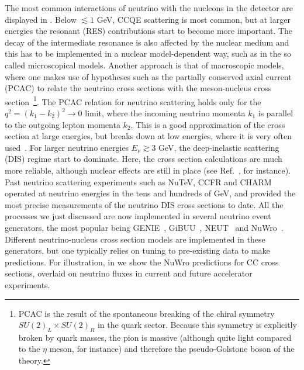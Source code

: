 The most common interactions of neutrino with the nucleons in the detector are displayed in . Below $\lesssim1$ GeV, CCQE scattering is most common, but at larger energies the resonant (RES) contributions start to become more important. The decay of the intermediate resonance is also affected by the nuclear medium and this has to be implemented in a nuclear model-dependent way, such as in the so called microscopical models. Another approach is that of macroscopic models, where one makes use of hypotheses such as the partially conserved axial current (PCAC) to relate the neutrino cross sections with the meson-nucleus cross section~\footnote{PCAC is the result of the spontaneous breaking of the chiral symmetry $SU(2)_L \times SU(2)_R$ in the quark sector. Because this symmetry is explicitly broken by quark masses, the pion is massive (although quite light compared to the $\eta$ meson, for instance) and therefore the pseudo-Golstone boson of the theory.}. The PCAC relation for neutrino scattering holds only for the $q^2 = (k_1 - k_2)^2 \to 0$ limit, where the incoming neutrino momenta $k_1$ is parallel to the outgoing lepton momenta $k_2$. This is a good approximation of the cross section at large energies, but breaks down at low energies, where it is very often used~\cite{Hernandez:2009vm}. For larger neutrino energies $E_\nu\gtrsim 3$ GeV, the deep-inelastic scattering (DIS) regime start to dominate. Here, the cross section calculations are much more reliable, although nuclear effects are still in place (see Ref.~\cite{Mousseau:2016snl}, for instance). Past neutrino scattering experiments such as NuTeV, CCFR and CHARM operated at neutrino energies in the tens and hundreds of GeV, and provided the most precise measurements of the neutrino DIS cross sections to date. All the processes we just discussed are now  implemented in several neutrino event generators, the most popular being GENIE~\cite{Andreopoulos:2009rq}, GiBUU~\cite{Buss:2011mx}, NEUT~\cite{Hayato:2002sd} and NuWro~\cite{Juszczak:2005zs}. Different neutrino-nucleus cross section models are implemented in these generators, but one typically relies on tuning to pre-existing data to make predictions. For illustration, in  we show the NuWro predictions for CC cross sections, overlaid on neutrino fluxes in current and future accelerator experiments.






